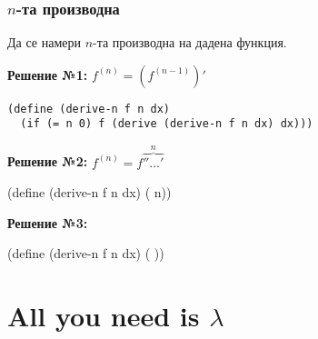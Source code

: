 \documentclass{beamer}
\begin{document}
\begin{frame}[fragile]
  \frametitle{$n$-та производна}

  Да се намери $n$-та производна на дадена функция.

  \vspace{1em}

  \pause

  \textbf{Решение №1:} $f^{(n)} = (f^{(n-1)})'$\pause
\begin{verbatim}
(define (derive-n f n dx)
  (if (= n 0) f (derive (derive-n f n dx) dx)))
\end{verbatim}

  \pause

  \textbf{Решение №2:} $f^{(n)} = f\overbrace{''\ldots'}^n$\pause
\begin{semiverbatim}
(define (derive-n f n dx)
  (  n))
\end{semiverbatim}

  \pause
  \textbf{Решение №3:}
\begin{semiverbatim}
(define (derive-n f n dx)
  (      ))
\end{semiverbatim}
\end{frame}

\section{All you need is $\lambda$}
\end{document}
